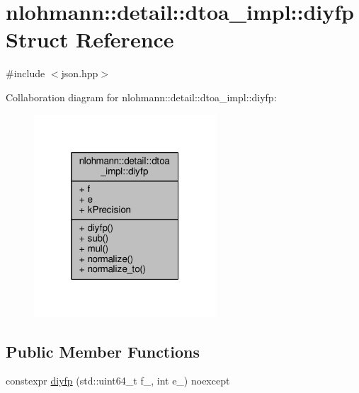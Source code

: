 \hypertarget{structnlohmann_1_1detail_1_1dtoa__impl_1_1diyfp}{}\section{nlohmann\+:\+:detail\+:\+:dtoa\+\_\+impl\+:\+:diyfp Struct Reference}
\label{structnlohmann_1_1detail_1_1dtoa__impl_1_1diyfp}


{\ttfamily \#include $<$json.\+hpp$>$}



Collaboration diagram for nlohmann\+:\+:detail\+:\+:dtoa\+\_\+impl\+:\+:diyfp\+:
\nopagebreak
\begin{figure}[H]
\begin{center}
\leavevmode
\includegraphics[width=193pt]{structnlohmann_1_1detail_1_1dtoa__impl_1_1diyfp__coll__graph}
\end{center}
\end{figure}
\subsection*{Public Member Functions}
\begin{DoxyCompactItemize}
\item 
constexpr \hyperlink{structnlohmann_1_1detail_1_1dtoa__impl_1_1diyfp_ad8798a8823a49c8412f0fada9892c918}{diyfp} (std\+::uint64\+\_\+t f\+\_\+, int e\+\_\+) noexcept
\end{DoxyCompactItemize}
